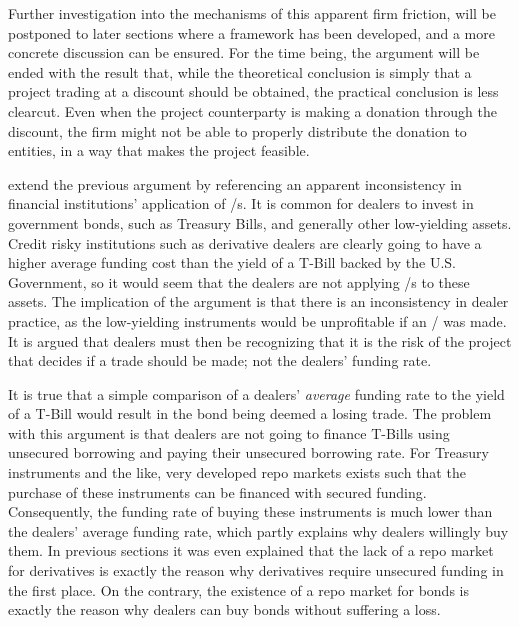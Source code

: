 \documentclass[main.tex]{subfiles}
\begin{document}
            Further investigation into the mechanisms of this apparent firm friction,
            will be postponed to later sections where a framework has been developed,
            and a more concrete discussion can be ensured.  
            For the time being, the argument will be ended with the result that, 
            while the theoretical conclusion is simply that a project trading at a discount should be obtained,
            the practical conclusion is less clearcut.
            Even when the project counterparty is making a donation through the discount,
            the firm might not be able to properly distribute the donation to entities,
            in a way that makes the project feasible.

            \textcite{HullWhite2012FVA} extend the previous argument by referencing 
            an apparent inconsistency in financial institutions' application of \FVA/s.
            It is common for dealers to invest in government bonds, such as Treasury Bills,
            and generally other low-yielding assets.
            Credit risky institutions such as derivative dealers are clearly going to have
            a higher average funding cost than the yield of a T-Bill backed by the U.S. Government,
            so it would seem that the dealers are not applying \FVA/s to these assets.
            The implication of the argument is that there is an inconsistency in dealer practice,
            as the low-yielding instruments would be unprofitable if an \FVA/ was made.
            It is argued that dealers must then be recognizing that it is 
            the risk of the project that decides if a trade should be made; 
            not the dealers' funding rate.

            It is true that a simple comparison of a dealers' \textit{average} funding rate
            to the yield of a T-Bill would result in the bond being deemed a losing trade.
            The problem with this argument is that dealers are not going to finance T-Bills
            using unsecured borrowing and paying their unsecured borrowing rate.
            For Treasury instruments and the like,
            very developed repo markets exists such that 
            the purchase of these instruments can be financed with secured funding.
            Consequently, the funding rate of buying these instruments is much lower 
            than the dealers' average funding rate,
            which partly explains why dealers willingly buy them.
            In previous sections it was even explained that
            the lack of a repo market for derivatives is exactly the reason 
            why derivatives require unsecured funding in the first place.
            On the contrary, the existence of a repo market for bonds is exactly the reason
            why dealers can buy bonds without suffering a loss.
\end{document}
